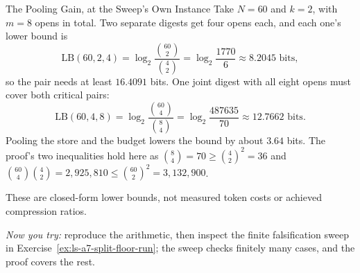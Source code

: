 \documentclass[11pt,a4paper]{article}
\theoremstyle{definition}
\theoremstyle{plain}
\begin{document}
\begin{pdexample}{The Pooling Gain, at the Sweep's Own Instance}
\setlength{\parskip}{4pt plus 1pt}
\label{ex:pooling-gain}
Take $N=60$ and $k=2$, with $m=8$ opens in total. Two separate digests get
four opens each, and each one's lower bound is
\[
\mathrm{LB}(60,2,4)=\log_2\!\frac{\binom{60}{2}}{\binom42}
=\log_2\frac{1770}{6}\approx8.2045\text{ bits},
\]
so the pair needs at least $16.4091$ bits. One joint digest with all eight
opens must cover both critical pairs:
\[
\mathrm{LB}(60,4,8)=\log_2\!\frac{\binom{60}{4}}{\binom84}
=\log_2\frac{487635}{70}\approx12.7662\text{ bits}.
\]
Pooling the store and the budget lowers the bound by about $3.64$ bits. The
proof's two inequalities hold here as
$\binom84=70\ge\binom42^2=36$ and
$\binom{60}4\binom42=2{,}925{,}810\le\binom{60}2^2=3{,}132{,}900$.

These are closed-form lower bounds, not measured token costs or achieved
compression ratios.

\emph{Now you try:} reproduce the arithmetic, then inspect
the finite falsification sweep in Exercise~\ref{ex:ls-a7-split-floor-run};
the sweep checks finitely many cases, and the proof covers the rest.
\end{pdexample}
\end{document}
